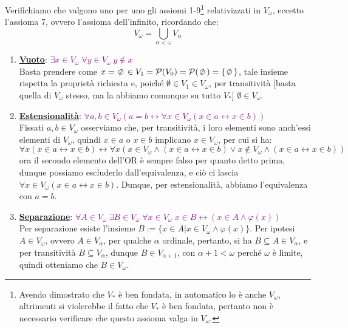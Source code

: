 \begin{soln}
	Verifichiamo che valgono uno per uno gli assiomi 1-9\footnote{Avendo dimostrato che $V_*$ \`e ben fondata, in automatico lo \`e anche $V_\omega$, altrimenti si violerebbe il fatto che $V_*$ \`e ben fondata, pertanto non \`e necessario verificare che questo assioma valga in $V_\omega$.} relativizzati in $V_\omega$, eccetto l'assioma 7, ovvero l'assioma dell'infinito, ricordando che:
	\[ V_\omega = \bigcup_{\alpha < \omega} V_\alpha
		\]
	\begin{enumerate}[(1)]
		\item \textbf{\underline{Vuoto}}: \textcolor{purple}{$\exists x \in V_\omega \; \forall y \in V_\omega \; y \not \in x$} \\
		Basta prendere come $x = \emptyset \in V_1 = \ps(V_0) = \ps(\emptyset) = \{\emptyset\}$, tale insieme rispetta la propriet\`a richiesta e, poich\'e $\emptyset \in V_1 \in V_\omega$, per transitivit\`a [basta quella di $V_\omega$ stesso, ma la abbiamo comunque su tutto $V_*$] $\emptyset \in V_\omega$.
		\item \textbf{\underline{Estensionalit\`a}}: \textcolor{purple}{$\forall a,b \in V_\omega (a = b \leftrightarrow \forall x \in V_\omega (x \in a \leftrightarrow x \in b))$} \\
		Fissati $a,b \in V_\omega$ osserviamo che, per transitivit\`a, i loro elementi sono anch'essi elementi di $V_\omega$, quindi $x \in a$ o $x \in b$ implicano $x \in V_\omega$, per cui si ha:
		\[ \forall x (x \in a \leftrightarrow x \in b) \leftrightarrow \forall x (x \in V_\omega \land (x \in a \leftrightarrow x \in b) \lor x \not \in V_\omega \land (x \in a \leftrightarrow x \in b))
			\] 
		ora il secondo elemento dell'OR \`e sempre falso per quanto detto prima, dunque possiamo escluderlo dall'equivalenza, e ci\`o ci lascia $\forall x \in V_\omega (x \in a \leftrightarrow x \in b)$.
		Dunque, per estensionalit\`a, abbiamo l'equivalenza con $a = b$.
		\item \textbf{\underline{Separazione}}: \textcolor{purple}{$\forall A \in V_\omega \; \exists B \in V_\omega \; \forall x \in V_\omega \; x \in B \leftrightarrow (x \in A \land \varphi(x))$} \\
		Per separazione esiste l'insieme $B :=\{x \in A | x \in V_\omega \land \varphi(x)\}$. Per ipotesi $A \in V_\omega$, ovvero $A \in V_{\alpha}$, per qualche $\alpha$ ordinale, pertanto, si ha $B \subseteq A \in V_\alpha$, e per transitivit\`a $B \subseteq V_\alpha$, dunque $B \in V_{\alpha + 1}$, con $\alpha + 1 < \omega$ perch\'e $\omega$ \`e limite, quindi otteniamo che $B \in V_\omega$.

\end{enumerate}
\end{soln}
